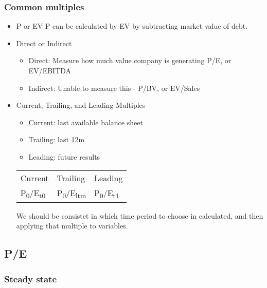 \documentclass[11pt]{article}
\begin{document}
\subsubsection*{Common multiples}
\label{sec:org2771b02}
\begin{itemize}
\item P or EV
\label{sec:orgdb7a484}
P can be calculated by EV by subtracting market value of debt.\\
\item Direct or Indirect
\label{sec:org46cfb52}
\begin{itemize}
\item Direct: Measure how much value company is generating P/E, or EV/EBITDA\\
\item Indirect: Unable to measure this - P/BV, or EV/Sales\\
\end{itemize}
\item Current, Trailing, and Leading Multiples
\label{sec:org7af4b03}
\begin{itemize}
\item Current: last available balance sheet\\
\item Trailing: last 12m\\
\item Leading: future results\\
\end{itemize}
\begin{center}
\begin{tabular}{lll}
\hline
Current & Trailing & Leading\\
P\textsubscript{0}/E\textsubscript{t0} & P\textsubscript{0}/E\textsubscript{ltm} & P\textsubscript{0}/E\textsubscript{t1}\\
\end{tabular}
\end{center}

We should be consistet in which time period to choose in calculated, and then applying that multiple to variables.\\
\end{itemize}

\subsection*{P/E}
\label{sec:orgc94a8ed}
\subsubsection*{Steady state}
\label{sec:org662c60a}
\end{document}
